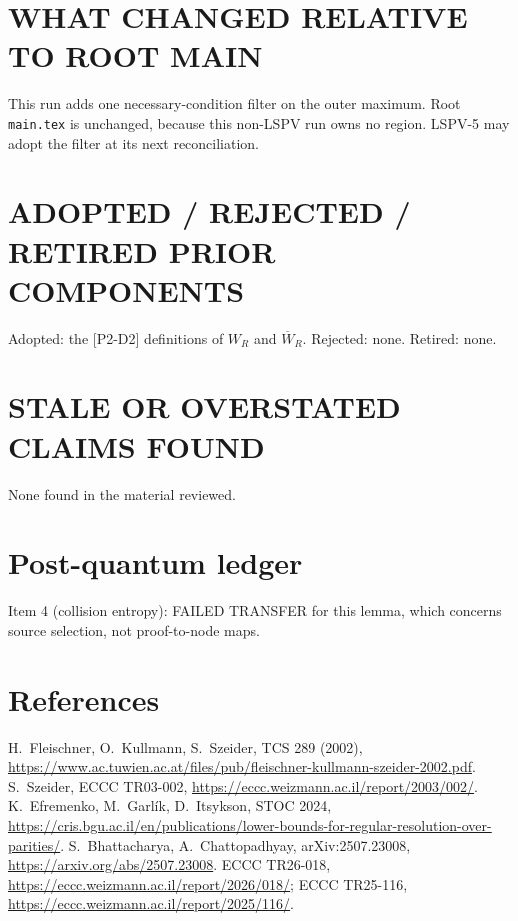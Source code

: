 \documentclass[11pt]{article}
\begin{document}
\section*{WHAT CHANGED RELATIVE TO ROOT MAIN}
This run adds one necessary-condition filter on the outer maximum. Root \texttt{main.tex} is unchanged, because this non-LSPV run owns no region.
LSPV-5 may adopt the filter at its next reconciliation.

\section*{ADOPTED / REJECTED / RETIRED PRIOR COMPONENTS}
Adopted: the [P2-D2] definitions of $W_R$ and $\overline W_R$. Rejected: none. Retired: none.

\section*{STALE OR OVERSTATED CLAIMS FOUND}
None found in the material reviewed.

\section*{Post-quantum ledger}
Item 4 (collision entropy): FAILED TRANSFER for this lemma, which concerns source selection, not proof-to-node maps.

\section*{References}
H.~Fleischner, O.~Kullmann, S.~Szeider, TCS 289 (2002), \url{https://www.ac.tuwien.ac.at/files/pub/fleischner-kullmann-szeider-2002.pdf}.
S.~Szeider, ECCC TR03-002, \url{https://eccc.weizmann.ac.il/report/2003/002/}.
K.~Efremenko, M.~Garl\'ik, D.~Itsykson, STOC 2024, \url{https://cris.bgu.ac.il/en/publications/lower-bounds-for-regular-resolution-over-parities/}.
S.~Bhattacharya, A.~Chattopadhyay, arXiv:2507.23008, \url{https://arxiv.org/abs/2507.23008}.
ECCC TR26-018, \url{https://eccc.weizmann.ac.il/report/2026/018/}; ECCC TR25-116, \url{https://eccc.weizmann.ac.il/report/2025/116/}.
\end{document}
